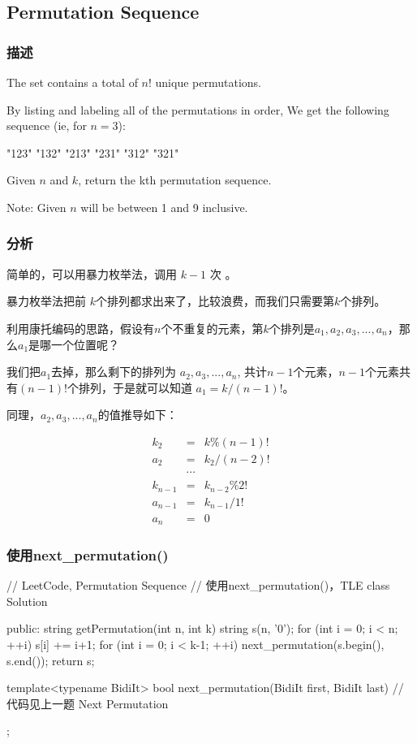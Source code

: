 \subsection{Permutation Sequence} %
\label{sec:permutation-sequence}


\subsubsection{描述}
The set \fn{[1,2,3,…,n]} contains a total of $n!$ unique permutations.

By listing and labeling all of the permutations in order,
We get the following sequence (ie, for $n = 3$):
\begin{Code}
	"123"
	"132"
	"213"
	"231"
	"312"
	"321"
\end{Code}

Given $n$ and $k$, return the kth permutation sequence.

Note: Given $n$ will be between 1 and 9 inclusive.


\subsubsection{分析}
简单的，可以用暴力枚举法，调用 $k-1$ 次 。

暴力枚举法把前 $k$个排列都求出来了，比较浪费，而我们只需要第$k$个排列。

利用康托编码的思路，假设有$n$个不重复的元素，第$k$个排列是$a_1, a_2, a_3, ..., 
a_n$，那么$a_1$是哪一个位置呢？

我们把$a_1$去掉，那么剩下的排列为
$a_2, a_3, ..., a_n$, 共计$n-1$个元素，$n-1$个元素共有$(n-1)!$个排列，于是就可以知道 
$a_1 = k / (n-1)!$。

同理，$a_2, a_3, ..., a_n$的值推导如下：

\begin{eqnarray}
	k_2 &=& k\%(n-1)! \nonumber \\
	a_2 &=& k_2/(n-2)! \nonumber \\
	\quad & \cdots \nonumber \\
	k_{n-1} &=& k_{n-2}\%2! \nonumber \\
	a_{n-1} &=& k_{n-1}/1! \nonumber \\
	a_n &=& 0 \nonumber
\end{eqnarray}


\subsubsection{使用next_permutation()}
\begin{Code}
	// LeetCode, Permutation Sequence
	// 使用next_permutation()，TLE
	class Solution {
		public:
		string getPermutation(int n, int k) {
			string s(n, '0');
			for (int i = 0; i < n; ++i)
			s[i] += i+1;
			for (int i = 0; i < k-1; ++i)
			next_permutation(s.begin(), s.end());
			return s;
		}
		
		template<typename BidiIt>
		bool next_permutation(BidiIt first, BidiIt last) {
			// 代码见上一题 Next Permutation
		}
	};
\end{Code}


